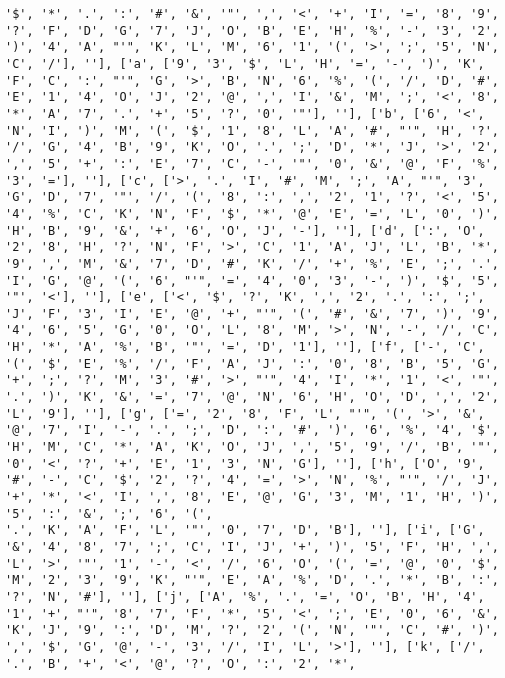 \documentclass{article}
\begin{document}
\begin{verbatim}
'$', '*', '.', ':', '#', '&', '"', ',', '<', '+', 'I', '=', '8', '9', '?', 'F', 'D', 'G', '7', 'J', 'O', 'B', 'E', 'H', '%', '-', '3', '2', ')', '4', 'A', "'", 'K', 'L', 'M', '6', '1', '(', '>', ';', '5', 'N', 'C', '/'], ''], ['a', ['9', '3', '$', 'L', 'H', '=', '-', ')', 'K', 'F', 'C', ':', "'", 'G', '>', 'B', 'N', '6', '%', '(', '/', 'D', '#', 'E', '1', '4', 'O', 'J', '2', '@', ',', 'I', '&', 'M', ';', '<', '8', '*', 'A', '7', '.', '+', '5', '?', '0', '"'], ''], ['b', ['6', '<', 'N', 'I', ')', 'M', '(', '$', '1', '8', 'L', 'A', '#', "'", 'H', '?', '/', 'G', '4', 'B', '9', 'K', 'O', '.', ';', 'D', '*', 'J', '>', '2', ',', '5', '+', ':', 'E', '7', 'C', '-', '"', '0', '&', '@', 'F', '%', '3', '='], ''], ['c', ['>', '.', 'I', '#', 'M', ';', 'A', "'", '3', 'G', 'D', '7', '"', '/', '(', '8', ':', ',', '2', '1', '?', '<', '5', '4', '%', 'C', 'K', 'N', 'F', '$', '*', '@', 'E', '=', 'L', '0', ')', 'H', 'B', '9', '&', '+', '6', 'O', 'J', '-'], ''], ['d', [':', 'O', '2', '8', 'H', '?', 'N', 'F', '>', 'C', '1', 'A', 'J', 'L', 'B', '*', '9', ',', 'M', '&', '7', 'D', '#', 'K', '/', '+', '%', 'E', ';', '.', 'I', 'G', '@', '(', '6', "'", '=', '4', '0', '3', '-', ')', '$', '5', '"', '<'], ''], ['e', ['<', '$', '?', 'K', ',', '2', '.', ':', ';', 'J', 'F', '3', 'I', 'E', '@', '+', "'", '(', '#', '&', '7', ')', '9', '4', '6', '5', 'G', '0', 'O', 'L', '8', 'M', '>', 'N', '-', '/', 'C', 'H', '*', 'A', '%', 'B', '"', '=', 'D', '1'], ''], ['f', ['-', 'C', '(', '$', 'E', '%', '/', 'F', 'A', 'J', ':', '0', '8', 'B', '5', 'G', '+', ';', '?', 'M', '3', '#', '>', "'", '4', 'I', '*', '1', '<', '"', '.', ')', 'K', '&', '=', '7', '@', 'N', '6', 'H', 'O', 'D', ',', '2', 'L', '9'], ''], ['g', ['=', '2', '8', 'F', 'L', "'", '(', '>', '&', '@', '7', 'I', '-', '.', ';', 'D', ':', '#', ')', '6', '%', '4', '$', 'H', 'M', 'C', '*', 'A', 'K', 'O', 'J', ',', '5', '9', '/', 'B', '"', '0', '<', '?', '+', 'E', '1', '3', 'N', 'G'], ''], ['h', ['O', '9', '#', '-', 'C', '$', '2', '?', '4', '=', '>', 'N', '%', "'", '/', 'J', '+', '*', '<', 'I', ',', '8', 'E', '@', 'G', '3', 'M', '1', 'H', ')', '5', ':', '&', ';', '6', '(', 
'.', 'K', 'A', 'F', 'L', '"', '0', '7', 'D', 'B'], ''], ['i', ['G', '&', '4', '8', '7', ';', 'C', 'I', 'J', '+', ')', '5', 'F', 'H', ',', 'L', '>', '"', '1', '-', '<', '/', '6', 'O', '(', '=', '@', '0', '$', 'M', '2', '3', '9', 'K', "'", 'E', 'A', '%', 'D', '.', '*', 'B', ':', '?', 'N', '#'], ''], ['j', ['A', '%', '.', '=', 'O', 'B', 'H', '4', '1', '+', "'", '8', '7', 'F', '*', '5', '<', ';', 'E', '0', '6', '&', 'K', 'J', '9', ':', 'D', 'M', '?', '2', '(', 'N', '"', 'C', '#', ')', ',', '$', 'G', '@', '-', '3', '/', 'I', 'L', '>'], ''], ['k', ['/', '.', 'B', '+', '<', '@', '?', 'O', ':', '2', '*', 

\end{verbatim}
\end{document}
